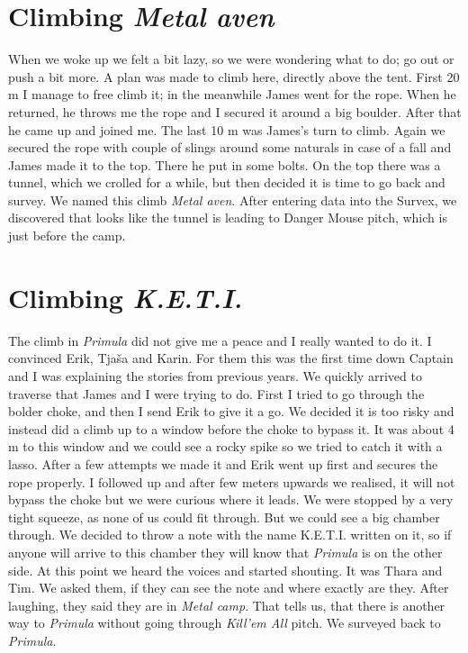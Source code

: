 \attrib{\izi}

\hypertarget{climbing-metal-aven}{%
\section{\texorpdfstring{Climbing \emph{Metal
aven}}{Climbing Metal aven}}\label{climbing-metal-aven}}

When we woke up we felt a bit lazy, so we were wondering what to do; go
out or push a bit more. A plan was made to climb here, directly above
the tent. First 20 m I manage to free climb it; in the meanwhile James
went for the rope. When he returned, he throws me the rope and I secured
it around a big boulder. After that he came up and joined me. The last
10 m was James's turn to climb. Again we secured the rope with couple of
slings around some naturals in case of a fall and James made it to the
top. There he put in some bolts. On the top there was a tunnel, which we
crolled for a while, but then decided it is time to go back and survey.
We named this climb \emph{Metal aven}. After entering data into the
Survex, we discovered that looks like the tunnel is leading to Danger
Mouse pitch, which is just before the camp.

\attrib{\izi}

\hypertarget{climbing-k.e.t.i.}{%
\section{\texorpdfstring{Climbing
\emph{K.E.T.I.}}{Climbing K.E.T.I.}}\label{climbing-k.e.t.i.}}

The climb in \emph{Primula} did not give me a peace and I really wanted
to do it. I convinced Erik, Tjaša and Karin. For them this was the first
time down Captain and I was explaining the stories from previous years.
We quickly arrived to traverse that James and I were trying to do. First
I tried to go through the bolder choke, and then I send Erik to give it
a go. We decided it is too risky and instead did a climb up to a window
before the choke to bypass it. It was about 4 m to this window and we
could see a rocky spike so we tried to catch it with a lasso. After a
few attempts we made it and Erik went up first and secures the rope
properly. I followed up and after few meters upwards we realised, it
will not bypass the choke but we were curious where it leads. We were
stopped by a very tight squeeze, as none of us could fit through. But we
could see a big chamber through. We decided to throw a note with the
name K.E.T.I. written on it, so if anyone will arrive to this chamber
they will know that \emph{Primula} is on the other side. At this point
we heard the voices and started shouting. It was Thara and Tim. We asked
them, if they can see the note and where exactly are they. After
laughing, they said they are in \emph{Metal camp}. That tells us, that
there is another way to \emph{Primula} without going through
\emph{Kill'em All} pitch. We surveyed back to \emph{Primula}.

